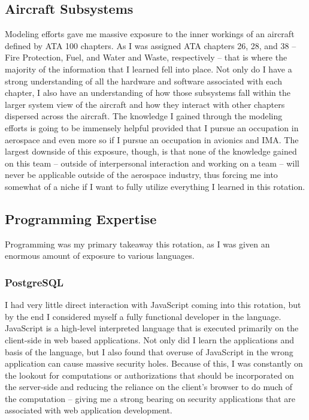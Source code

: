 \documentclass{article}
\begin{document}
\subsection{Aircraft Subsystems}
Modeling efforts gave me massive exposure to the inner workings of an aircraft defined by ATA 100 chapters. As I was assigned ATA chapters 26, 28, and 38 -- Fire Protection, Fuel, and Water and Waste, respectively -- that is where the majority of the information that I learned fell into place. Not only do I have a strong understanding of all the hardware and software associated with each chapter, I also have an understanding of how those subsystems fall within the larger system view of the aircraft and how they interact with other chapters dispersed across the aircraft.
The knowledge I gained through the modeling efforts is going to be immensely helpful provided that I pursue an occupation in aerospace and even more so if I pursue an occupation in avionics and IMA. The largest downside of this exposure, though, is that none of the knowledge gained on this team -- outside of interpersonal interaction and working on a team -- will never be applicable outside of the aerospace industry, thus forcing me into somewhat of a niche if I want to fully utilize everything I learned in this rotation.

\subsection{Programming Expertise}
Programming was my primary takeaway this rotation, as I was given an enormous amount of exposure to various languages.
\subsubsection{PostgreSQL}
I had very little direct interaction with JavaScript coming into this rotation, but by the end I considered myself a fully functional developer in the language. JavaScript is a high-level interpreted language that is executed primarily on the client-side in web based applications. Not only did I learn the applications and basis of the language, but I also found that overuse of JavaScript in the wrong application can cause massive security holes. Because of this, I was constantly on the lookout for computations or authorizations that should be incorporated on the server-side and reducing the reliance on the client's browser to do much of the computation -- giving me a strong bearing on security applications that are associated with web application development.
\end{document}
